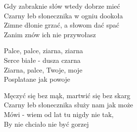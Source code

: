 
\begin{text}
    Gdy zabraknie słów wtedy dobrze mieć\\
    Czarny łeb słonecznika w ogniu dookoła\\
    Zimne dłonie grzać, a słowom dać spać\\
    Zanim znów ich nie przywołasz

    \vin Palce, palce, ziarna, ziarna\\
    \vin Serce białe - dusza czarna\\
    \vin Ziarna, palce, Twoje, moje\\
    \vin Posplatane jak powoje

    Męczyć się bez mąk, martwić się bez skarg\\
    Czarny łeb słonecznika służy nam jak może\\
    Mówi - wiem od lat tu nigdy nie tak,\\
    By nie chciało nie być gorzej
\end{text}
\begin{chord}

\end{chord}